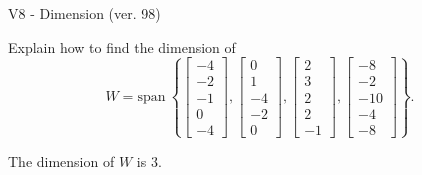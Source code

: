 \begin{exercise}
  \begin{exerciseTitle}V8 - Dimension (ver. 98)\end{exerciseTitle}
  \begin{exerciseStatement}
    Explain how to find the dimension of 
\[W=\mathrm{span}\ \left\{\left[\begin{array}{r}
-4 \\
-2 \\
-1 \\
0 \\
-4
\end{array}\right] , \left[\begin{array}{r}
0 \\
1 \\
-4 \\
-2 \\
0
\end{array}\right] , \left[\begin{array}{r}
2 \\
3 \\
2 \\
2 \\
-1
\end{array}\right] , \left[\begin{array}{r}
-8 \\
-2 \\
-10 \\
-4 \\
-8
\end{array}\right]\right\}.\]



  \end{exerciseStatement}
  \begin{exerciseAnswer}
   The dimension of \(W\) is  \(3\).
  


  \end{exerciseAnswer}
\end{exercise}